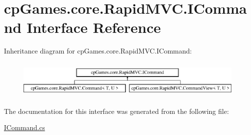 \hypertarget{interfacecp_games_1_1core_1_1_rapid_m_v_c_1_1_i_command}{}\section{cp\+Games.\+core.\+Rapid\+M\+V\+C.\+I\+Command Interface Reference}
\label{interfacecp_games_1_1core_1_1_rapid_m_v_c_1_1_i_command}
Inheritance diagram for cp\+Games.\+core.\+Rapid\+M\+V\+C.\+I\+Command\+:\begin{figure}[H]
\begin{center}
\leavevmode
\includegraphics[height=1.854305cm]{interfacecp_games_1_1core_1_1_rapid_m_v_c_1_1_i_command}
\end{center}
\end{figure}


The documentation for this interface was generated from the following file\+:\begin{DoxyCompactItemize}
\item 
\mbox{\hyperlink{_i_command_8cs}{I\+Command.\+cs}}\end{DoxyCompactItemize}
